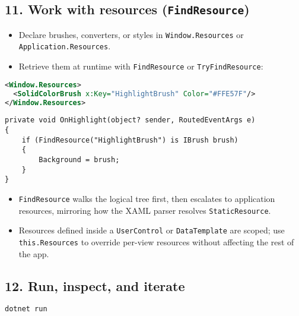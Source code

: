 \subsection{\texorpdfstring{11. Work with resources
(\texttt{FindResource})}{11. Work with resources (FindResource)}}\label{work-with-resources-findresource}

\begin{itemize}
\tightlist
\item
  Declare brushes, converters, or styles in
  \passthrough{\lstinline!Window.Resources!} or
  \passthrough{\lstinline!Application.Resources!}.
\item
  Retrieve them at runtime with \passthrough{\lstinline!FindResource!}
  or \passthrough{\lstinline!TryFindResource!}:
\end{itemize}

\begin{lstlisting}[language=XML]
<Window.Resources>
  <SolidColorBrush x:Key="HighlightBrush" Color="#FFE57F"/>
</Window.Resources>
\end{lstlisting}

\begin{lstlisting}
private void OnHighlight(object? sender, RoutedEventArgs e)
{
    if (FindResource("HighlightBrush") is IBrush brush)
    {
        Background = brush;
    }
}
\end{lstlisting}

\begin{itemize}
\tightlist
\item
  \passthrough{\lstinline!FindResource!} walks the logical tree first,
  then escalates to application resources, mirroring how the XAML parser
  resolves \passthrough{\lstinline!StaticResource!}.
\item
  Resources defined inside a \passthrough{\lstinline!UserControl!} or
  \passthrough{\lstinline!DataTemplate!} are scoped; use
  \passthrough{\lstinline!this.Resources!} to override per-view
  resources without affecting the rest of the app.
\end{itemize}

\subsection{12. Run, inspect, and
iterate}\label{run-inspect-and-iterate}

\begin{lstlisting}[language=bash]
dotnet run
\end{lstlisting}

